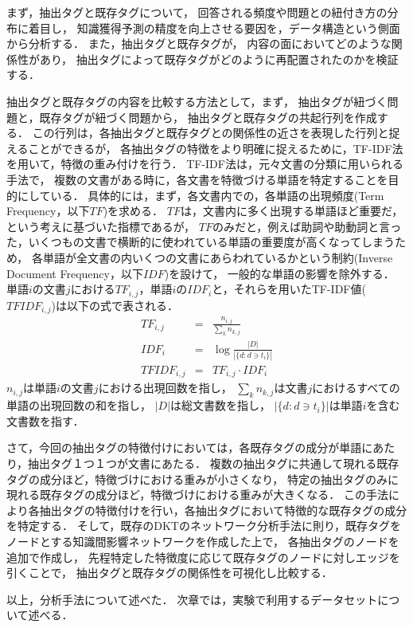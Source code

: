 まず，抽出タグと既存タグについて，
回答される頻度や問題との紐付き方の分布に着目し，
知識獲得予測の精度を向上させる要因を，データ構造という側面から分析する．
また，抽出タグと既存タグが，
内容の面においてどのような関係性があり，
抽出タグによって既存タグがどのように再配置されたのかを検証する．

抽出タグと既存タグの内容を比較する方法として，まず，
抽出タグが紐づく問題と，既存タグが紐づく問題から，
抽出タグと既存タグの共起行列を作成する．
この行列は，各抽出タグと既存タグとの関係性の近さを表現した行列と捉えることができるが，
各抽出タグの特徴をより明確に捉えるために，TF-IDF法を用いて，特徴の重み付けを行う．
TF-IDF法は，元々文書の分類に用いられる手法で，
複数の文書がある時に，各文書を特徴づける単語を特定することを目的にしている．
具体的には，まず，各文書内での，各単語の出現頻度(Term Frequency，以下$TF$)を求める．
$TF$は，文書内に多く出現する単語ほど重要だ，という考えに基づいた指標であるが，
$TF$のみだと，例えば助詞や助動詞と言った，いくつもの文書で横断的に使われている単語の重要度が高くなってしまうため，
各単語が全文書の内いくつの文書にあらわれているかという制約(Inverse Document Frequency，以下$IDF$)を設けて，
一般的な単語の影響を除外する．
単語$i$の文書$j$における$TF_{i,j}$，単語$i$の$IDF_i$と，それらを用いたTF-IDF値($TFIDF_{i,j}$)は以下の式で表される．
\begin{eqnarray}
TF_{i,j} &=& \frac {n_{i,j}}{\sum _{k}n_{k,j}}
\\
IDF_i &=& \log {\frac {|D|}{|\{d:d\ni t_{i}\}|}}
\\
TFIDF_{i,j} &=& TF_{i,j} \cdot IDF_i
\end{eqnarray}
$n_{i,j}$は単語$i$の文書$j$における出現回数を指し，
$\sum _{k}n_{k,j}$は文書$j$におけるすべての単語の出現回数の和を指し，
$|D|$は総文書数を指し，
$|\{d:d\ni t_{i}\}|$は単語$i$を含む文書数を指す．


さて，今回の抽出タグの特徴付けにおいては，各既存タグの成分が単語にあたり，抽出タグ１つ１つが文書にあたる．
複数の抽出タグに共通して現れる既存タグの成分ほど，特徴づけにおける重みが小さくなり，
特定の抽出タグのみに現れる既存タグの成分ほど，特徴づけにおける重みが大きくなる．
この手法により各抽出タグの特徴付けを行い，各抽出タグにおいて特徴的な既存タグの成分を特定する．
そして，既存のDKTのネットワーク分析手法に則り，既存タグをノードとする知識間影響ネットワークを作成した上で，
各抽出タグのノードを追加で作成し，
先程特定した特徴度に応じて既存タグのノードに対しエッジを引くことで，
抽出タグと既存タグの関係性を可視化し比較する．


\vvspace
以上，分析手法について述べた．
次章では，実験で利用するデータセットについて述べる．

